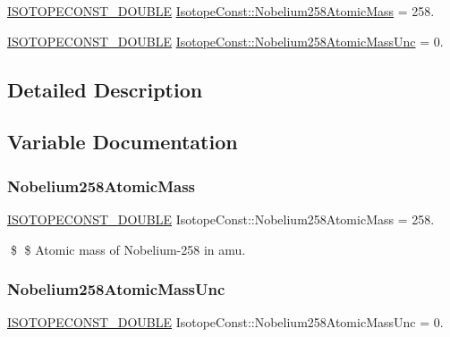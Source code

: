 \begin{DoxyCompactItemize}
\item 
\mbox{\hyperlink{group___isotope_const-_macros_ga8f45a7272ce02c0b4c65c44636ed719a}{I\+S\+O\+T\+O\+P\+E\+C\+O\+N\+S\+T\+\_\+\+D\+O\+U\+B\+LE}} \mbox{\hyperlink{group___isotope_const-_nobelium-_no258_ga69b75e9e11cae58ec08363081f4189aa}{Isotope\+Const\+::\+Nobelium258\+Atomic\+Mass}} = 258.
\item 
\mbox{\hyperlink{group___isotope_const-_macros_ga8f45a7272ce02c0b4c65c44636ed719a}{I\+S\+O\+T\+O\+P\+E\+C\+O\+N\+S\+T\+\_\+\+D\+O\+U\+B\+LE}} \mbox{\hyperlink{group___isotope_const-_nobelium-_no258_ga863ff27ab4bbc2bbc485080c2754cb4d}{Isotope\+Const\+::\+Nobelium258\+Atomic\+Mass\+Unc}} = 0.
\end{DoxyCompactItemize}


\subsection{Detailed Description}


\subsection{Variable Documentation}
\mbox{\label{group___isotope_const-_nobelium-_no258_ga69b75e9e11cae58ec08363081f4189aa}} 
\subsubsection{\texorpdfstring{Nobelium258\+Atomic\+Mass}{Nobelium258AtomicMass}}
{\footnotesize\ttfamily \mbox{\hyperlink{group___isotope_const-_macros_ga8f45a7272ce02c0b4c65c44636ed719a}{I\+S\+O\+T\+O\+P\+E\+C\+O\+N\+S\+T\+\_\+\+D\+O\+U\+B\+LE}} Isotope\+Const\+::\+Nobelium258\+Atomic\+Mass = 258.}

\$ \$ Atomic mass of Nobelium-\/258 in amu. \mbox{\label{group___isotope_const-_nobelium-_no258_ga863ff27ab4bbc2bbc485080c2754cb4d}} 
\subsubsection{\texorpdfstring{Nobelium258\+Atomic\+Mass\+Unc}{Nobelium258AtomicMassUnc}}
{\footnotesize\ttfamily \mbox{\hyperlink{group___isotope_const-_macros_ga8f45a7272ce02c0b4c65c44636ed719a}{I\+S\+O\+T\+O\+P\+E\+C\+O\+N\+S\+T\+\_\+\+D\+O\+U\+B\+LE}} Isotope\+Const\+::\+Nobelium258\+Atomic\+Mass\+Unc = 0.}

